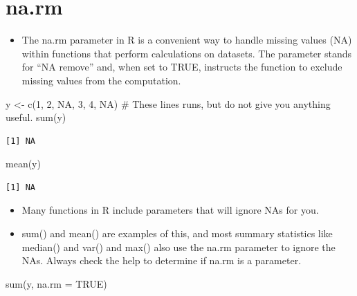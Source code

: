 \documentclass[
  letterpaper,
  DIV=11,
  numbers=noendperiod]{scrreprt}
\newenvironment{Shaded}{\begin{snugshade}}{\end{snugshade}}
\newcommand{\AttributeTok}[1]{\textcolor[rgb]{0.40,0.45,0.13}{#1}}
\newcommand{\CommentTok}[1]{\textcolor[rgb]{0.37,0.37,0.37}{#1}}
\newcommand{\ConstantTok}[1]{\textcolor[rgb]{0.56,0.35,0.01}{#1}}
\newcommand{\DecValTok}[1]{\textcolor[rgb]{0.68,0.00,0.00}{#1}}
\newcommand{\FunctionTok}[1]{\textcolor[rgb]{0.28,0.35,0.67}{#1}}
\newcommand{\NormalTok}[1]{\textcolor[rgb]{0.00,0.23,0.31}{#1}}
\newcommand{\OtherTok}[1]{\textcolor[rgb]{0.00,0.23,0.31}{#1}}
\providecommand{\tightlist}{%
  \setlength{\itemsep}{0pt}\setlength{\parskip}{0pt}}\usepackage{longtable,booktabs,array}
\begin{document}
\section{na.rm}\label{na.rm}

\begin{itemize}
\tightlist
\item
  The na.rm parameter in R is a convenient way to handle missing values
  (NA) within functions that perform calculations on datasets. The
  parameter stands for ``NA remove'' and, when set to TRUE, instructs
  the function to exclude missing values from the computation.
\end{itemize}

\begin{Shaded}
\begin{Highlighting}[]
\NormalTok{y }\OtherTok{\textless{}{-}} \FunctionTok{c}\NormalTok{(}\DecValTok{1}\NormalTok{, }\DecValTok{2}\NormalTok{, }\ConstantTok{NA}\NormalTok{, }\DecValTok{3}\NormalTok{, }\DecValTok{4}\NormalTok{, }\ConstantTok{NA}\NormalTok{)}
\CommentTok{\# These lines runs, but do not give you anything useful.}
\FunctionTok{sum}\NormalTok{(y)}
\end{Highlighting}
\end{Shaded}

\begin{verbatim}
[1] NA
\end{verbatim}

\begin{Shaded}
\begin{Highlighting}[]
\FunctionTok{mean}\NormalTok{(y)}
\end{Highlighting}
\end{Shaded}

\begin{verbatim}
[1] NA
\end{verbatim}

\begin{itemize}
\item
  Many functions in R include parameters that will ignore NAs for you.
\item
  sum() and mean() are examples of this, and most summary statistics
  like median() and var() and max() also use the na.rm parameter to
  ignore the NAs. Always check the help to determine if na.rm is a
  parameter.
\end{itemize}

\begin{Shaded}
\begin{Highlighting}[]
\FunctionTok{sum}\NormalTok{(y, }\AttributeTok{na.rm =} \ConstantTok{TRUE}\NormalTok{)}
\end{Highlighting}
\end{Shaded}
\end{document}
